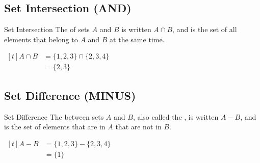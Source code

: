 \documentclass[../notes.tex]{subfiles}
\begin{document}
			\subsection[Set Intersection]{Set Intersection (AND)}
				\begin{definition}{Set Intersection}
					The  of sets $A$ and $B$ is written $A \cap  B$, and is the set of all elements that belong to $A$ and $B$ at the same time.
				\end{definition}
				\nopagebreak
				\begin{center}
					\begin{venntwo}[][$A \cap B = \bigl\{x \mid x \in A$ and $x \in B\bigr\}$]
						\fillACapB
					\end{venntwo}
				\end{center}
				\begin{example}[hbox] $
					\begin{aligned}[t]
						A \cap B &= \{1, 2, 3\} \cap \{2, 3, 4\}\\
						&= \{2, 3\}
					\end{aligned} $
				\end{example}

			\subsection[Set Difference]{Set Difference (MINUS)}
				\begin{definition}{Set Difference}
					The  between sets $A$ and $B$, also called the , is written $A - B$, and is the set of elements that are in $A$ that are not in $B$.
				\end{definition}
				\nopagebreak
				\begin{center}
					\begin{venntwo}[][$A - B = \bigl\{x \mid x \in A$ and $x \notin B\bigr\}$]
						\fillOnlyA
					\end{venntwo}
				\end{center}
				\begin{example}[hbox] $
					\begin{aligned}[t]
						A - B &= \{1, 2, 3\} - \{2, 3, 4\}\\
						&= \{1\}
					\end{aligned} $
				\end{example}
\end{document}

